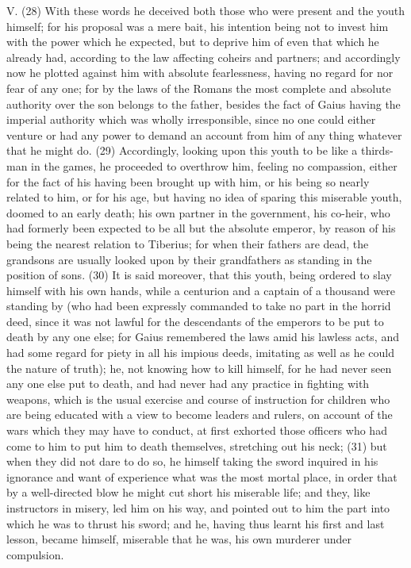 V. (28) With these words he deceived both those who were present and the youth himself; for his
proposal was a mere bait, his intention being not to invest him with the power which he expected,
but to deprive him of even that which he already had, according to the law affecting coheirs and
partners; and accordingly now he plotted against him with absolute fearlessness, having no regard
for nor fear of any one; for by the laws of the Romans the most complete and absolute authority
over the son belongs to the father, besides the fact of Gaius having the imperial authority which
was wholly irresponsible, since no one could either venture or had any power to demand an
account from him of any thing whatever that he might do. (29) Accordingly, looking upon this youth
to be like a thirds-man in the games, he proceeded to overthrow him, feeling no compassion, either
for the fact of his having been brought up with him, or his being so nearly related to him, or for his
age, but having no idea of sparing this miserable youth, doomed to an early death; his own partner
in the government, his co-heir, who had formerly been expected to be all but the absolute emperor,
by reason of his being the nearest relation to Tiberius; for when their fathers are dead, the
grandsons are usually looked upon by their grandfathers as standing in the position of sons. (30) It
is said moreover, that this youth, being ordered to slay himself with his own hands, while a
centurion and a captain of a thousand were standing by (who had been expressly commanded to
take no part in the horrid deed, since it was not lawful for the descendants of the emperors to be
put to death by any one else; for Gaius remembered the laws amid his lawless acts, and had some
regard for piety in all his impious deeds, imitating as well as he could the nature of truth); he, not
knowing how to kill himself, for he had never seen any one else put to death, and had never had
any practice in fighting with weapons, which is the usual exercise and course of instruction for
children who are being educated with a view to become leaders and rulers, on account of the wars
which they may have to conduct, at first exhorted those officers who had come to him to put him to
death themselves, stretching out his neck; (31) but when they did not dare to do so, he himself
taking the sword inquired in his ignorance and want of experience what was the most mortal place,
in order that by a well-directed blow he might cut short his miserable life; and they, like instructors in
misery, led him on his way, and pointed out to him the part into which he was to thrust his sword;
and he, having thus learnt his first and last lesson, became himself, miserable that he was, his own
murderer under compulsion.

